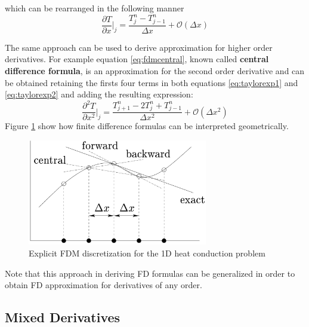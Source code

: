     which can be rearranged in the following manner
        \begin{equation}
    \frac{\partial T}{\partial x}\bigg\rvert_j  = \frac{T^n_{j} - T^n_{j-1}}{\Delta x} + \mathcal{O}(\Delta x)
    \label{eq:fdmfbackward}
    \end{equation}
    
   The same approach can be used to derive approximation for higher order derivatives.
   For example equation \ref{eq:fdmcentral}, known called \textbf{central difference formula}, is an approximation for the second order derivative and can be obtained retaining the firsts four terms in both equations \ref{eq:taylorexp1} and \ref{eq:taylorexp2} and adding the resulting expression:   
    \begin{equation}
		\frac{\partial^2 T}{\partial x^2}\bigg\rvert_j = \frac{T^n_{j+1}- 2T^n_{j} + T^n_{j-1}}{\Delta x^2} + \mathcal{O}(\Delta x^2)
		\label{eq:fdmcentral}
    \end{equation}    
    Figure \ref{fig:geometrical_intepretation} show how finite difference formulas can be interpreted geometrically.
\begin{figure}
	\centering
	\includegraphics[width=0.70\textwidth]{./images/CA_FDM/geometrical_interpretation_fd}
	\caption{Explicit FDM discretization for the 1D heat conduction problem}
	\label{fig:geometrical_intepretation}
\end{figure}     
Note that this approach in deriving FD formulas can be generalized in order to obtain FD approximation for derivatives of any order.

 \subsection{Mixed Derivatives}

